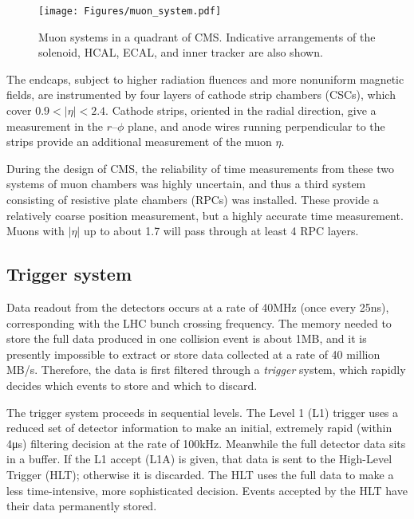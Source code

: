 \begin{figure}[hbtp]
  \begin{center}
    \texttt{[image: Figures/muon\_system.pdf]}
    \caption{
    Muon systems in a quadrant of CMS. Indicative arrangements of the solenoid, HCAL, ECAL, and inner
    tracker are also shown.
    }
    \label{fig:muon_system}
  \end{center}
\end{figure}

The endcaps, subject to higher radiation fluences and more nonuniform magnetic fields, are instrumented by four layers of cathode strip chambers (CSCs),
which cover $0.9 < |\eta| < 2.4$. Cathode strips, oriented in the radial direction, give a measurement in the $r$--$\phi$ plane, and anode
wires running perpendicular to the strips provide an additional measurement of the muon $\eta$.

During the design of CMS, the reliability of time measurements from these two systems of muon chambers was highly uncertain, and thus a third system
consisting of resistive plate chambers (RPCs) was installed. These provide a relatively coarse position measurement, but a highly
accurate time measurement. Muons with $|\eta|$ up to about 1.7 will pass through at least 4 RPC layers.

\subsection{Trigger system} \label{sec:LHCCMS_CMS_trigger}
Data readout from the detectors occurs at a rate of 40\unit{MHz} (once every 25\unit{ns}), corresponding with the LHC bunch crossing frequency.
The memory needed to store the full data produced in one collision event is about 1\unit{MB}, and
it is presently impossible to extract or store data collected at a rate of 40 million \unit{MB/s}.
Therefore, the data is first filtered through a \textit{trigger} system, which rapidly decides which events to store
and which to discard.

The trigger system proceeds in sequential levels. The Level 1 (L1) trigger uses a reduced set of detector information to make an initial,
extremely rapid (within 4\unit{\micro s}) filtering decision at the rate of 100\unit{kHz}. Meanwhile the full detector data sits in a buffer.
If the L1 accept (L1A) is given, that data is sent to the High-Level Trigger (HLT); otherwise it is discarded.
The HLT uses the full data to make a less time-intensive, more sophisticated decision. Events accepted by the HLT have their data permanently stored.

